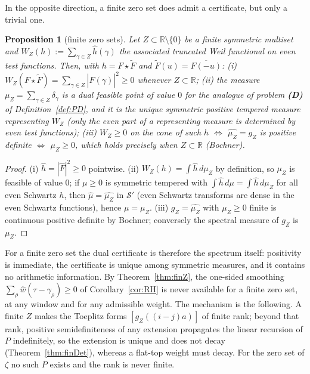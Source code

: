 \documentclass[11pt]{amsart}
\newtheorem{proposition}[theorem]{Proposition}
\theoremstyle{definition}
\theoremstyle{remark}
\newcommand{\R}{\mathbb R}
\newcommand{\wh}{\widehat w}
\newcommand{\Fh}{\widehat F}
\begin{document}
In the opposite direction, a finite zero set does admit a certificate, but only a trivial one.

\begin{proposition}[finite zero sets]\label{prop:finuniv}
Let $Z\subset\R\setminus\{0\}$ be a finite symmetric multiset and
$W_Z(h):=\sum_{\gamma\in Z}\widehat h(\gamma)$ the associated truncated Weil functional on even test
functions. Then, with $h=F\star\widetilde F$ and $\widetilde F(u)=\overline{F(-u)}$:
\emph{(i)} $W_Z(F\star\widetilde F)=\sum_{\gamma\in Z}|\Fh(\gamma)|^2\ge0$ whenever $Z\subset\R$;
\emph{(ii)} the measure $\mu_Z=\sum_{\gamma\in Z}\delta_\gamma$ is a dual feasible point of value
$0$ for the analogue of problem \textbf{(D)} of Definition~\ref{def:PD}, and it is the unique symmetric
positive tempered measure representing $W_Z$ (only the even part of a representing measure is
determined by even test functions);
\emph{(iii)} $W_Z\ge0$ on the cone of such $h$ $\iff$ $\widehat{\mu_Z}=g_Z$ is positive definite
$\iff$ $\mu_Z\ge0$, which holds precisely when $Z\subset\R$ (Bochner).
\end{proposition}
\begin{proof}
(i) $\widehat h=|\Fh|^2\ge0$ pointwise. (ii) $W_Z(h)=\int\widehat h\,d\mu_Z$ by definition, so
$\mu_Z$ is feasible of value $0$; if $\mu\ge0$ is symmetric tempered with
$\int\widehat h\,d\mu=\int\widehat h\,d\mu_Z$ for all even Schwartz $h$, then $\widehat\mu=
\widehat{\mu_Z}$ in $\mathcal S'$ (even Schwartz transforms are dense in the even Schwartz
functions), hence $\mu=\mu_Z$. (iii) $g_Z=\widehat{\mu_Z}$ with $\mu_Z\ge0$ finite is continuous
positive definite by Bochner; conversely the spectral measure of $g_Z$ is $\mu_Z$.
\end{proof}

For a finite zero set the dual certificate is therefore the spectrum itself: positivity is
immediate, the certificate is unique among symmetric measures, and it contains no arithmetic
information. By Theorem~\ref{thm:finZ}, the one-sided smoothing
$\sum_\rho\wh(\tau-\gamma_\rho)\ge0$ of Corollary~\ref{cor:RH} is never available for a finite zero
set, at any window and for any admissible weight. The mechanism is the following. A finite $Z$
makes the Toeplitz forms $[g_Z((i-j)a)]$ of finite rank; beyond that rank, positive semidefiniteness
of any extension propagates the linear recursion of $P$ indefinitely, so the extension is unique and
does not decay (Theorem~\ref{thm:finDet}), whereas a flat-top weight must decay. For the zero set of
$\zeta$ no such $P$ exists and the rank is never finite.
\end{document}

